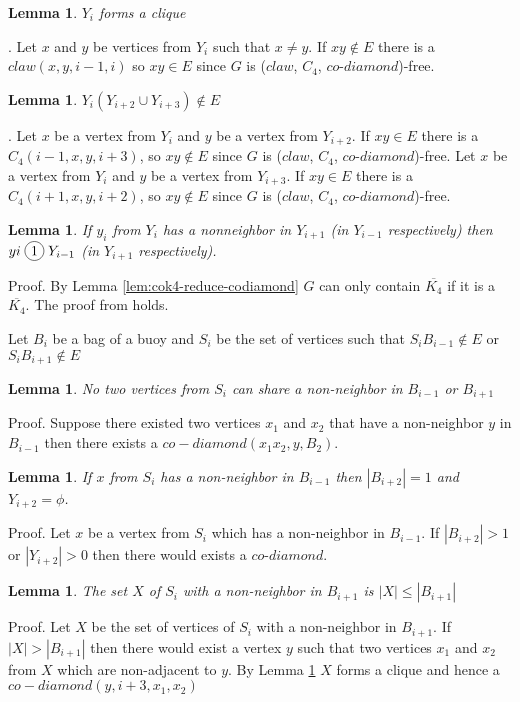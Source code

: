 \documentclass[12pt]{article}
\newcommand*\circled[1]{\tikz[baseline=(char.base)]{
            \node[shape=circle,draw,inner sep=2pt] (char) {#1};}}
\newtheorem{Lemma}[Theorem]{Lemma}
\def\CCD{($claw$, $C_4$, $co$-$diamond$)}
\begin{document}
 


\begin{Lemma}\label{lem:3K-clique}
$Y_i$ forms a clique
\end{Lemma}
. Let $x$ and $y$ be vertices from $Y_i$ such that $x \neq y$. If $xy \not \in E$ there is a $claw (x, y, i-1, i)$ so $xy \in E$ since $G$ is {\CCD}-free.

\begin{Lemma}\label{lem:yi-adjacency-yi2}
$Y_i(Y_{i+2} \cup Y_{i+3}) \not \in E$
\end{Lemma}
. Let $x$ be a vertex from $Y_i$ and $y$ be a vertex from $Y_{i+2}$. If $xy \in E$ there is a $C_4 (i-1, x, y, i+3)$, so $xy \not \in E$ since $G$ is {\CCD}-free. Let $x$ be a vertex from $Y_i$ and $y$ be a vertex from $Y_{i+3}$. If $xy \in E$ there is a $C_4 (i+1, x, y, i+2)$, so $xy \not \in E$ since $G$ is {\CCD}-free.

\begin{Lemma}\label{lem:yi-miss-two-neighbors}
If $y_i$ from $Y_i$ has a nonneighbor in $Y_{i+1}$ (in $Y_{i-1}$ respectively) then $yi \;\circled{1}\; Y_{i-1}$ (in $Y_{i+1}$ respectively).
\end{Lemma}
\noindent {\it} Proof. By Lemma \ref{lem:cok4-reduce-codiamond} $G$ can only contain $\overline{K_4}$ if it is a $\overline{K_4}$. The proof from \cite{BrEnLeLo} holds.


Let $B_i$ be a bag of a buoy and $S_i$ be the set of vertices such that $S_iB_{i-1} \not \in E$ or $S_iB_{i+1} \not \in E$


\begin{Lemma}\label{lem:si-no-share-vertex}
No two vertices from $S_i$ can share a non-neighbor in $B_{i-1}$ or $B_{i+1}$
\end{Lemma}
\noindent {\it} Proof. Suppose there existed two vertices $x_1$ and $x_2$ that have a non-neighbor $y$ in $B_{i-1}$ then there exists a $co-diamond (x_1x_2, y, B_2)$.

\begin{Lemma}\label{lem:buoy-3K-limit}
If $x$ from $S_i$ has a non-neighbor in $B_{i-1}$ then $|B_{i+2}| = 1$ and $Y_{i+2} = \phi$.  
\end{Lemma}
\noindent {\it} Proof. Let $x$ be a vertex from $S_i$ which has a non-neighbor in $B_{i-1}$. If $|B_{i+2}| > 1$ or  $|Y_{i+2}| > 0$  then there would exists a $co$-$diamond$.

\begin{Lemma}\label{lem:si-limit}
The set $X$ of $S_i$ with a non-neighbor in $B_{i+1}$ is $|X| \leq |B_{i+1}|$ 
\end{Lemma}
\noindent {\it} Proof. Let $X$ be the set of vertices of $S_i$ with a non-neighbor in $B_{i+1}$. If $|X| > |B_{i+1}|$ then there would exist a vertex $y$ such that two vertices $x_1$ and $x_2$ from $X$ which are non-adjacent to $y$. By Lemma \ref{lem:3K-clique} $X$ forms a clique and hence a $co-diamond (y, i+3, x_1, x_2)$
\end{document}
